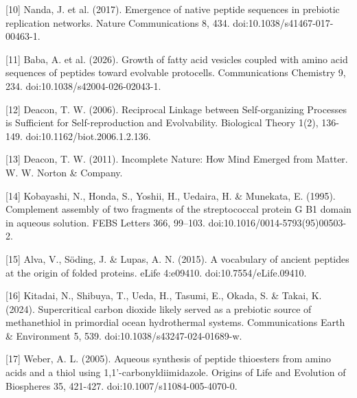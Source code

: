 \documentclass[11pt]{article}
\begin{document}
{[}10{]} Nanda, J. et al. (2017). Emergence of native peptide sequences in prebiotic replication networks. Nature Communications 8, 434. doi:10.1038/s41467-017-00463-1.

{[}11{]} Baba, A. et al. (2026). Growth of fatty acid vesicles coupled with amino acid sequences of peptides toward evolvable protocells. Communications Chemistry 9, 234. doi:10.1038/s42004-026-02043-1.

{[}12{]} Deacon, T. W. (2006). Reciprocal Linkage between Self-organizing Processes is Sufficient for Self-reproduction and Evolvability. Biological Theory 1(2), 136-149. doi:10.1162/biot.2006.1.2.136.

{[}13{]} Deacon, T. W. (2011). Incomplete Nature: How Mind Emerged from Matter. W. W. Norton \& Company.

{[}14{]} Kobayashi, N., Honda, S., Yoshii, H., Uedaira, H. \& Munekata, E. (1995). Complement assembly of two fragments of the streptococcal protein G B1 domain in aqueous solution. FEBS Letters 366, 99--103. doi:10.1016/0014-5793(95)00503-2.

{[}15{]} Alva, V., Söding, J. \& Lupas, A. N. (2015). A vocabulary of ancient peptides at the origin of folded proteins. eLife 4:e09410. doi:10.7554/eLife.09410.

{[}16{]} Kitadai, N., Shibuya, T., Ueda, H., Tasumi, E., Okada, S. \& Takai, K. (2024). Supercritical carbon dioxide likely served as a prebiotic source of methanethiol in primordial ocean hydrothermal systems. Communications Earth \& Environment 5, 539. doi:10.1038/s43247-024-01689-w.

{[}17{]} Weber, A. L. (2005). Aqueous synthesis of peptide thioesters from amino acids and a thiol using 1,1'-carbonyldiimidazole. Origins of Life and Evolution of Biospheres 35, 421-427. doi:10.1007/s11084-005-4070-0.
\end{document}
